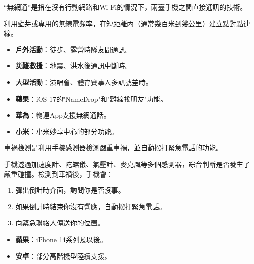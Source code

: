 
“無網通”是指在沒有行動網路和Wi-Fi的情況下，兩臺手機之間直接通訊的技術。


利用藍芽或專用的無線電頻率，在短距離內（通常幾百米到幾公里）建立點對點連線。


\begin{itemize}
  \item \textbf{戶外活動}：徒步、露營時隊友間通訊。
  \item \textbf{災難救援}：地震、洪水後通訊中斷時。
  \item \textbf{大型活動}：演唱會、體育賽事人多訊號差時。
\end{itemize}


\begin{itemize}
  \item \textbf{蘋果}：iOS 17的"NameDrop"和"離線找朋友"功能。
  \item \textbf{華為}：暢連App支援無網通話。
  \item \textbf{小米}：小米妙享中心的部分功能。
\end{itemize}


車禍檢測是利用手機感測器檢測嚴重車禍，並自動撥打緊急電話的功能。


手機透過加速度計、陀螺儀、氣壓計、麥克風等多個感測器，綜合判斷是否發生了嚴重碰撞。檢測到車禍後，手機會：

\begin{enumerate}
  \item 彈出倒計時介面，詢問你是否沒事。
  \item 如果倒計時結束你沒有響應，自動撥打緊急電話。
  \item 向緊急聯絡人傳送你的位置。
\end{enumerate}


\begin{itemize}
  \item \textbf{蘋果}：iPhone 14系列及以後。
  \item \textbf{安卓}：部分高階機型陸續支援。
\end{itemize}


